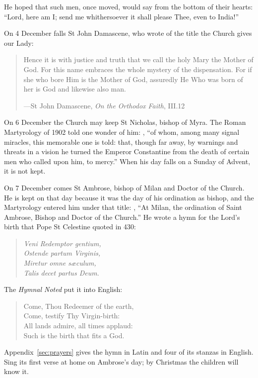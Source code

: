 \noindent He hoped that such men, once moved, would say from the bottom of their
hearts: ``Lord, here am I; send me whithersoever it shall please Thee, even to
India!''

On 4 December falls St John Damascene, who wrote of the title the Church gives
our Lady:

\begin{quote}
Hence it is with justice and truth that we call the holy Mary the Mother of God.
For this name embraces the whole mystery of the dispensation. For if she who
bore Him is the Mother of God, assuredly He Who was born of her is God and
likewise also man.\par
{\smallskip\noindent\small ---St John Damascene, \emph{On the Orthodox Faith}, III.12\par}
\end{quote}

On 6 December the Church may keep St Nicholas, bishop of Myra. The Roman
Martyrology of 1902 told one wonder of him:
, ``of whom, among many
signal miracles, this memorable one is told: that, though far away, by warnings
and threats in a vision he turned the Emperor Constantine from the death of
certain men who called upon him, to mercy.'' When his day falls on a Sunday of
Advent, it is not kept.

On 7 December comes St Ambrose, bishop of Milan and Doctor of the Church. He is
kept on that day because it was the day of his ordination as bishop, and the
Martyrology entered him under that title: , ``At Milan, the ordination of Saint Ambrose, Bishop and Doctor of the
Church.'' He wrote a hymn for the Lord's birth that Pope St Celestine quoted in
430:

\begin{verse}\itshape
Veni Redemptor gentium,\\
Ostende partum Virginis,\\
Miretur omne sæculum,\\
Talis decet partus Deum.
\end{verse}

\noindent The \emph{Hymnal Noted} put it into English:

\begin{verse}
Come, Thou Redeemer of the earth,\\
Come, testify Thy Virgin-birth:\\
All lands admire, all times applaud:\\
Such is the birth that fits a God.
\end{verse}

\noindent Appendix~\ref{sec:prayers} gives the hymn in Latin and four of its
stanzas in English. Sing its first verse at home on Ambrose's day; by
Christmas the children will know it.
